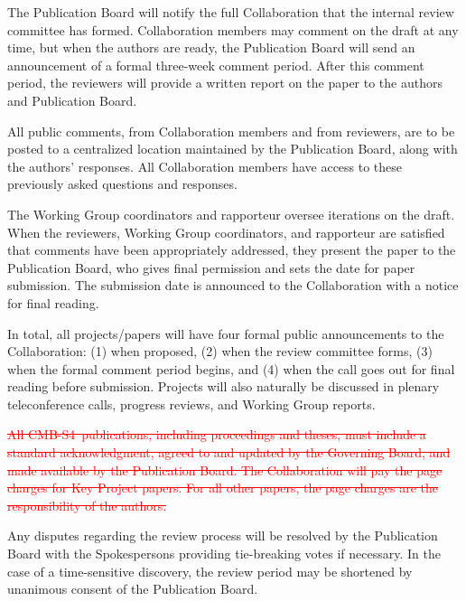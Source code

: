 \documentclass[12pt]{article}
\newcommand\collabname{CMB-S4}
\newcommand{\revision}[1]{\textcolor{Red}{#1}}
\begin{document}
The Publication Board will notify the full Collaboration that the internal review committee has formed.  Collaboration members may comment on the draft at any time, but when the authors are ready, the Publication Board will send an announcement of a formal three-week comment period.  After this comment period, the reviewers will provide a written report on the paper to the authors and Publication Board.

All public comments, from Collaboration members and from reviewers, are to be posted to a centralized location maintained by the Publication Board, along with the authors' responses.  All Collaboration members have access to these previously asked questions and responses.

The Working Group coordinators and rapporteur oversee iterations on the draft.  When the reviewers, Working Group coordinators, and rapporteur are satisfied that comments have been appropriately addressed, they present the paper to the Publication Board, who gives final permission and sets the date for paper submission.  The submission date is announced to the Collaboration with a notice for final reading.  

In total, all projects/papers will have four formal public announcements to the Collaboration:
(1) when proposed,
(2) when the review committee forms,
(3) when the formal comment period begins, and
(4) when the call goes out for final reading before submission.
  Projects will also naturally be discussed in plenary teleconference calls, progress reviews, and Working Group reports.

\revision{\sout{All \collabname\ publications, including proceedings and theses, must include a standard acknowledgment, agreed to and updated by the Governing Board, and made available by the Publication Board.  The Collaboration will pay the page charges for Key Project papers. For all other papers, the page charges are the responsibility of the authors.}}

Any disputes regarding the review process will be resolved by the Publication Board with the Spokespersons providing tie-breaking votes if necessary. In the case of a time-sensitive discovery, the review period may be shortened by unanimous consent of the Publication Board.
\end{document}
